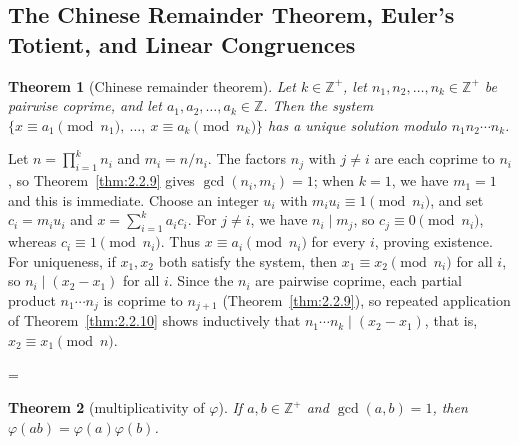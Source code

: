 \documentclass[11pt]{article}
\makeatletter
\theoremstyle{ntstyle}
\newtheorem{theorem}{Theorem}[subsection]
\let\nt@closedisplay\]
\def\nt@guardedclose{\@ifnextchar\par{\nt@closeafterpar}{\@ifnextchar\end{\postdisplaypenalty\@M\nt@closedisplay}{\nt@closedisplay}}}
\def\nt@closeafterpar\par{\@ifnextchar\par{\nt@closeafterpar}{\@ifnextchar\end{\postdisplaypenalty\@M\nt@closedisplay\par}{\nt@closedisplay\par}}}
\renewenvironment{proof}[1][\proofname]{\par
  \pushQED{\qed}\normalfont\topsep\medskipamount\edef\nt@afterproof{\@endparpenalty=\the\@endparpenalty\relax}\@beginparpenalty\@M\@endparpenalty\@M\let\]\nt@guardedclose\trivlist\item[]\textit{#1\@addpunct{.}} \ignorespaces}{\ifvmode\addpenalty\@M\fi\popQED\nt@afterproof\endtrivlist\@endpefalse}
\makeatother
\begin{document}
\subsection{The Chinese Remainder Theorem, Euler's Totient, and Linear Congruences}

\begin{theorem}[Chinese remainder theorem]\label{thm:3.4.1} Let
	$k\in\mathbb{Z}^+$, let $n_1, n_2, \ldots, n_k \in \mathbb{Z}^+$ be
	pairwise coprime, and let $a_1, a_2, \ldots, a_k \in \mathbb{Z}$. Then
	the system $\{x \equiv a_1 \pmod{n_1},\ \ldots,\ x \equiv a_k \pmod{n_k}\}$ has
	a unique solution modulo $n_1 n_2 \cdots n_k$.

\end{theorem}

\begin{proof} Let $n = \prod_{i=1}^{k} n_i$ and $m_i=n/n_i$.
	The factors $n_j$ with $j\neq i$ are each coprime to $n_i$, so
	Theorem~\ref{thm:2.2.9} gives $\gcd(n_i,m_i)=1$; when $k=1$,
	we have $m_1=1$ and this is immediate. Choose an integer $u_i$ with
	$m_i u_i\equiv1\pmod{n_i}$, and set $c_i=m_i u_i$ and
	$x=\sum_{i=1}^{k}a_i c_i$. For $j\neq i$, we have $n_i\mid m_j$, so
	$c_j\equiv0\pmod{n_i}$, whereas $c_i\equiv1\pmod{n_i}$.
	Thus $x\equiv a_i\pmod{n_i}$ for every $i$, proving existence. For
	uniqueness, if $x_1, x_2$ both satisfy the system, then $x_1
		\equiv x_2 \pmod{n_i}$ for all $i$, so $n_i \mid (x_2 - x_1)$ for all
	$i$. Since the $n_i$ are pairwise coprime, each partial product
	$n_1\cdots n_j$ is coprime to $n_{j+1}$ (Theorem~\ref{thm:2.2.9}), so repeated application of Theorem~\ref{thm:2.2.10} shows inductively that $n_1\cdots n_k\mid(x_2-x_1)$, that is,
	$x_2 \equiv x_1 \pmod{n}$.

\end{proof}
\begin{theorem}[multiplicativity of $\varphi$]\label{thm:3.4.2} If $a, b \in \mathbb{Z}^+$
	and $\gcd(a, b) = 1$, then $\varphi(ab) = \varphi(a)\varphi(b)$.

\end{theorem}
\end{document}
